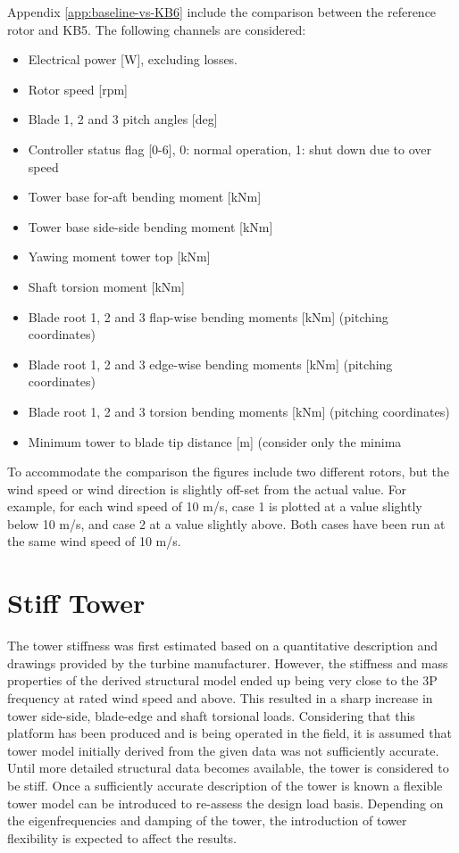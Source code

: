 Appendix \ref{app:baseline-vs-KB6} include the comparison between the reference rotor and KB5. The following channels are considered:
\begin{itemize}
	\item Electrical power [W], excluding losses.
    \item Rotor speed [rpm]
    \item Blade 1, 2 and 3 pitch angles [deg]
    \item Controller status flag [0-6], 0: normal operation, 1: shut down due to over speed
    \item Tower base for-aft bending moment [kNm]
    \item Tower base side-side bending moment [kNm]
    \item Yawing moment tower top [kNm]
    \item Shaft torsion moment [kNm]
    \item Blade root 1, 2 and 3 flap-wise bending moments [kNm] (pitching coordinates)
    \item Blade root 1, 2 and 3 edge-wise bending moments [kNm] (pitching coordinates)
    \item Blade root 1, 2 and 3 torsion bending moments [kNm] (pitching coordinates)
    \item Minimum tower to blade tip distance [m] (consider only the minima
\end{itemize}

To accommodate the comparison the figures include two different rotors, but the wind speed or wind direction is slightly off-set from the actual value. For example, for each wind speed of 10 m/s, case 1 is plotted at a  value slightly below 10 m/s, and case 2 at a value slightly above. Both cases have been run at the same wind speed of 10 m/s.


\section{Stiff Tower}
\label{sec:dlb:Stiff Tower}

The tower stiffness was first estimated based on a quantitative description and drawings provided by the turbine manufacturer. However, the stiffness and mass properties of the derived structural model ended up being very close to the 3P frequency at rated wind speed and above. This resulted in a sharp increase in tower side-side, blade-edge and shaft torsional loads. Considering that this platform has been produced and is being operated in the field, it is assumed that tower model initially derived from the given data was not sufficiently accurate. Until more detailed structural data becomes available, the tower is considered to be stiff. Once a sufficiently accurate description of the tower is known a flexible tower model can be introduced to re-assess the design load basis. Depending on the eigenfrequencies and damping of the tower, the introduction of tower flexibility is expected to affect the results.


